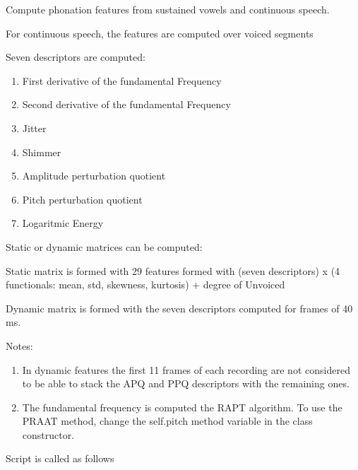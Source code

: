 \documentclass[letterpaper,10pt,english]{sphinxmanual}
\begin{document}
\begin{fulllineitems}
\label{\detokenize{Phonation:phonation.Phonation}}
Compute phonation features from sustained vowels and continuous speech.

For continuous speech, the features are computed over voiced segments

Seven descriptors are computed:
\begin{enumerate}
\item {} 
First derivative of the fundamental Frequency

\item {} 
Second derivative of the fundamental Frequency

\item {} 
Jitter

\item {} 
Shimmer

\item {} 
Amplitude perturbation quotient

\item {} 
Pitch perturbation quotient

\item {} 
Logaritmic Energy

\end{enumerate}

Static or dynamic matrices can be computed:

Static matrix is formed with 29 features formed with (seven descriptors) x (4 functionals: mean, std, skewness, kurtosis) + degree of Unvoiced

Dynamic matrix is formed with the seven descriptors computed for frames of 40 ms.

Notes:
\begin{enumerate}
\item {} 
In dynamic features the first 11 frames of each recording are not considered to be able to stack the APQ and PPQ descriptors with the remaining ones.

\item {} 
The fundamental frequency is computed the RAPT algorithm. To use the PRAAT method,  change the \sphinxquotedblleft{}self.pitch method\sphinxquotedblright{} variable in the class constructor.

\end{enumerate}

Script is called as follows


\end{fulllineitems}
\end{document}
